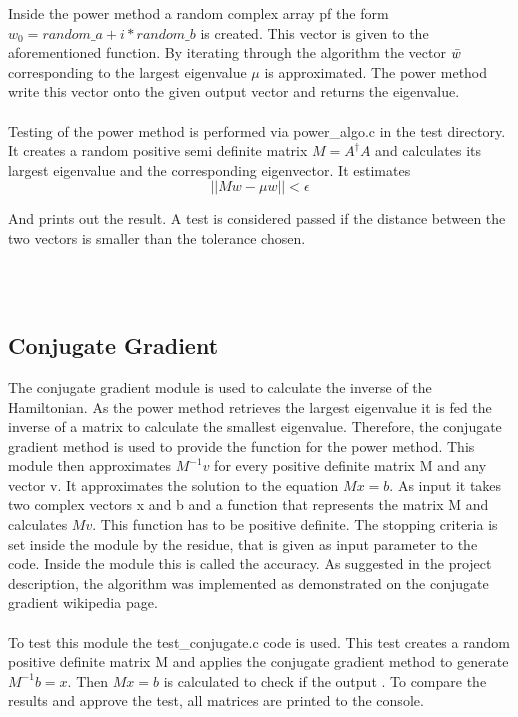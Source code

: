 \documentclass{article}
\begin{document}
Inside the power method a random complex array pf the form $w_0 = random\_a + i * random\_b$ is created.
This vector is given to the aforementioned function.
By iterating through the algorithm the vector $\Bar{w}$ corresponding to the largest eigenvalue $\mu$ is approximated.
The power method write this vector onto the given output vector and returns the eigenvalue.\\
\\
Testing of the power method is performed via {\selectfont power\_algo.c} in the test directory.
It creates a random positive semi definite matrix $M=A^{\dagger}A$ and calculates its largest eigenvalue and the corresponding eigenvector.
It estimates 
$$ || Mw -\mu w|| < \epsilon $$

And prints out the result. A test is considered passed if the distance between the two vectors is smaller than the tolerance chosen. 

\\
\\

\subsection{Conjugate Gradient}\label{cnjgt grdnt}
The conjugate gradient module is used to calculate the inverse of the Hamiltonian.
As the power method retrieves the largest eigenvalue it is fed the inverse of a matrix to calculate the smallest eigenvalue.
Therefore, the conjugate gradient method is used to provide the function for the power method.
This module then approximates $M^{-1}v$ for every positive definite matrix M and any vector v. It approximates the solution to the equation $Mx=b$.
As input it takes two complex vectors x and b and a function that represents the matrix M and calculates $Mv$.
This function has to be positive definite.
The stopping criteria is set inside the module by the residue, that is given as input parameter to the code.
Inside the module this is called the accuracy.
As suggested in the project description, the algorithm was implemented as demonstrated on the conjugate gradient wikipedia page.\\
\\
To test this module the {\selectfont test\_conjugate.c} code is used.
This test creates a random positive definite matrix M and applies the conjugate gradient method to generate $M^{-1}b = x$.
Then $Mx=b$ is calculated to check if the output . %
To compare the results and approve the test, all matrices are printed to the console.\\
\\
\end{document}
